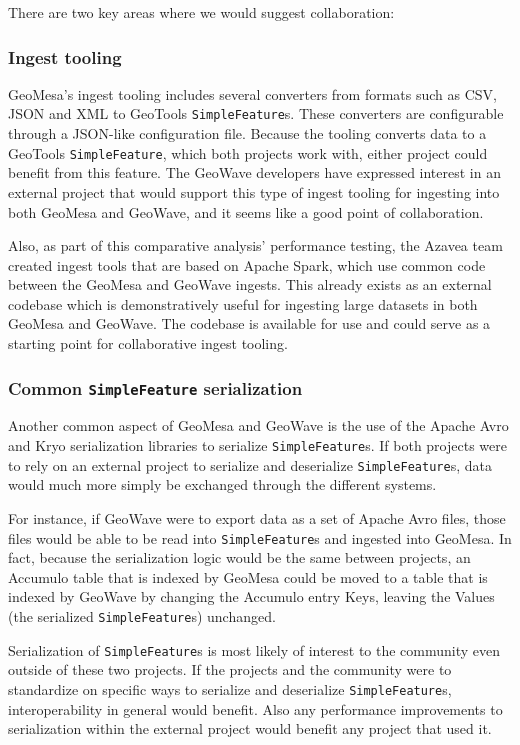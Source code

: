 There are two key areas where we would suggest collaboration:


\subsubsection{Ingest tooling}
\label{sec:conclusions:collaboration:ingest}

GeoMesa's ingest tooling includes several converters from formats such as CSV, JSON and XML to GeoTools \texttt{SimpleFeature}s.
These converters are configurable through a JSON-like configuration file.
Because the tooling converts data to a GeoTools \texttt{SimpleFeature}, which both projects work with, either project could benefit from this feature.
The GeoWave developers have expressed interest in an external project that would support this type of ingest tooling for ingesting into both GeoMesa and GeoWave, and it seems like a good point of collaboration.

Also, as part of this comparative analysis' performance testing, the Azavea team created ingest tools that are based on Apache Spark, which use common code between the GeoMesa and GeoWave ingests.
This already exists as an external codebase which is demonstratively useful for ingesting large datasets in both GeoMesa and GeoWave.
The codebase is available for use and could serve as a starting point for collaborative ingest tooling.


\subsubsection{Common \texttt{SimpleFeature} serialization}
\label{sec:conclusions:collaboration:serialization}

Another common aspect of GeoMesa and GeoWave is the use of the Apache Avro and Kryo serialization libraries to serialize \texttt{SimpleFeature}s.
If both projects were to rely on an external project to serialize and deserialize \texttt{SimpleFeature}s, data would much more simply be exchanged through the different systems.

For instance, if GeoWave were to export data as a set of Apache Avro files, those files would be able to be read into \texttt{SimpleFeature}s and ingested into GeoMesa.
In fact, because the serialization logic would be the same between projects, an Accumulo table that is indexed by GeoMesa could be moved to a table that is indexed by GeoWave by changing the Accumulo entry Keys, leaving the Values (the serialized \texttt{SimpleFeature}s) unchanged.

Serialization of \texttt{SimpleFeature}s is most likely of interest to the community even outside of these two projects.
If the projects and the community were to standardize on specific ways to serialize and deserialize \texttt{SimpleFeature}s, interoperability in general would benefit.
Also any performance improvements to serialization within the external project would benefit any project that used it.
